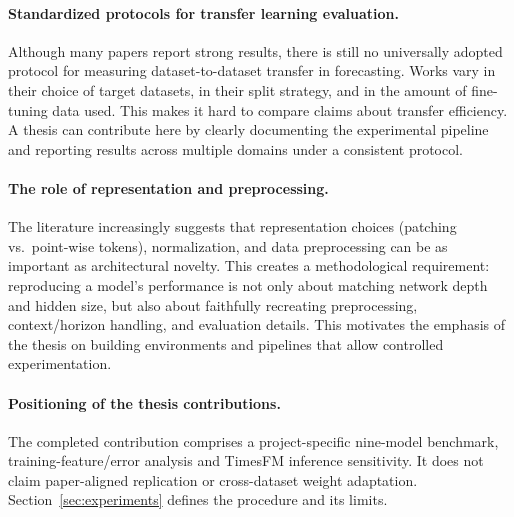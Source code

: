 \paragraph{Standardized protocols for transfer learning evaluation.}
Although many papers report strong results, there is still no universally adopted protocol for measuring dataset-to-dataset transfer in forecasting. Works vary in their choice of target datasets, in their split strategy, and in the amount of fine-tuning data used. This makes it hard to compare claims about transfer efficiency. A thesis can contribute here by clearly documenting the experimental pipeline and reporting results across multiple domains under a consistent protocol.

\paragraph{The role of representation and preprocessing.}
The literature increasingly suggests that representation choices (patching vs.\ point-wise tokens), normalization, and data preprocessing can be as important as architectural novelty. This creates a methodological requirement: reproducing a model’s performance is not only about matching network depth and hidden size, but also about faithfully recreating preprocessing, context/horizon handling, and evaluation details. This motivates the emphasis of the thesis on building environments and pipelines that allow controlled experimentation.

\paragraph{Positioning of the thesis contributions.}
The completed contribution comprises a project-specific nine-model benchmark, training-feature/error analysis and TimesFM inference sensitivity. It does not claim paper-aligned replication or cross-dataset weight adaptation. Section~\ref{sec:experiments} defines the procedure and its limits.





